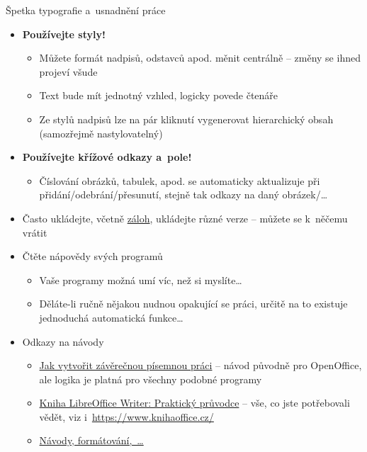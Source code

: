 \documentclass[compress, ucs, xelatex, xcolor=dvipsnames, print,
	hyperref={
		bookmarks=true,
		unicode=true,
		colorlinks=true,
		pdftitle={Citacni software},
		plainpages=false,
		pdfauthor={Vojtech Zeisek},
		pdfsubject={Kratky uvod do citacniho software},
		pdfcreator={XeLaTeX},
		pdfkeywords={citace, reference, software, literatura},
		linkcolor=Red,
		anchorcolor=Red,
		citecolor=Green,
		filecolor=Magenta,
		menucolor=Green,
		urlcolor=Cyan,
		pdftex},
	url={hyphens, lowtilde} %
	]{beamer}
\begin{document}
\begin{frame}[allowframebreaks]{Špetka typografie a~usnadnění práce}
	\begin{itemize}
		\item \textbf{Používejte styly!}
			\begin{itemize}
				\item Můžete formát nadpisů, odstavců apod. měnit centrálně -- změny se ihned projeví všude
				\item Text bude mít jednotný vzhled, logicky povede čtenáře
				\item Ze stylů nadpisů lze na pár kliknutí vygenerovat hierarchický obsah (samozřejmě nastylovatelný)
			\end{itemize}
		\item \textbf{Používejte křížové odkazy a~pole!}
			\begin{itemize}
				\item Číslování obrázků, tabulek, apod. se automaticky aktualizuje při přidání/odebrání/přesunutí, stejně tak odkazy na daný obrázek/\ldots
			\end{itemize}
		\item Často ukládejte, včetně \href{https://www.natur.cuni.cz/biologie/botanika/provozni-informace/servery-weby-a-pocitace/moznosti-zalohovani-dat}{záloh}, ukládejte různé verze -- můžete se k~něčemu vrátit
		\item Čtěte nápovědy svých programů
			\begin{itemize}
				\item Vaše programy možná umí víc, než si myslíte\ldots
				\item Děláte-li ručně nějakou nudnou opakující se práci, určitě na to existuje jednoduchá automatická funkce\ldots
			\end{itemize}
		\item Odkazy na návody
			\begin{itemize}
				\item \href{https://www.linuxexpres.cz/kancelar/jak-vytvorit-zaverecnou-pisemnou-praci}{Jak vytvořit závěrečnou písemnou práci} -- návod původně pro OpenOffice, ale logika je platná pro všechny podobné programy
				\item \href{https://www.root.cz/knihy/libreoffice-writer-prakticky-pruvodce/}{Kniha LibreOffice Writer: Praktický průvodce} -- vše, co jste potřebovali vědět, viz i~\url{https://www.knihaoffice.cz/}
				\item \href{https://formatovani-dokumentu.cz/navody}{Návody, formátování,~\ldots}
			\end{itemize}

\end{itemize}
\end{frame}
\end{document}
